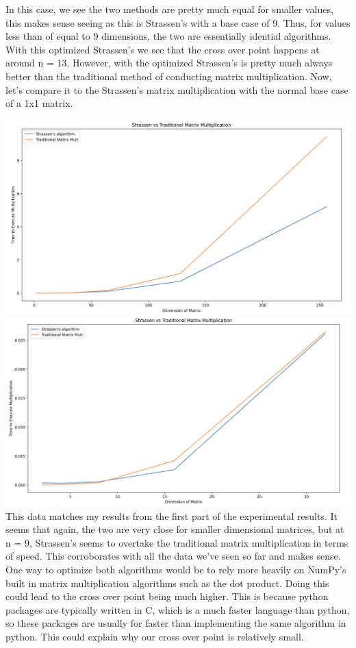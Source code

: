 \documentclass{article}
\begin{document}
In this case, we see the two methods are pretty much equal for smaller values, this makes sense seeing as this is Strassen's with a base case of 9. Thus, for values less than of equal to 9 dimensions, the two are essentially idential algorithms. With this optimized Strassen's we see that the cross over point happens at around n = 13. However, with the optimized Strassen's is pretty much always better than the traditional method of conducting matrix multiplication. Now, let's compare it to the Strassen's matrix multiplication with the normal base case of a 1x1 matrix.

\includegraphics[width=\textwidth]{graph4.png}
\includegraphics[width=\textwidth]{graph5.png} \\

This data matches my results from the first part of the experimental results. It seems that again, the two are very close for smaller dimensional matrices, but at n = 9, Strassen's seems to overtake the traditional matrix multiplication in terms of speed. This corroborates with all the data we've seen so far and makes sense. One way to optimize both algorithms would be to rely more heavily on NumPy's built in matrix multiplication algorithms such as the dot product. Doing this could lead to the cross over point being much higher. This is because python packages are typically written in C, which is a much faster language than python, so these packages are usually for faster than implementing the same algorithm in python. This could explain why our cross over point is relatively small.
\end{document}
